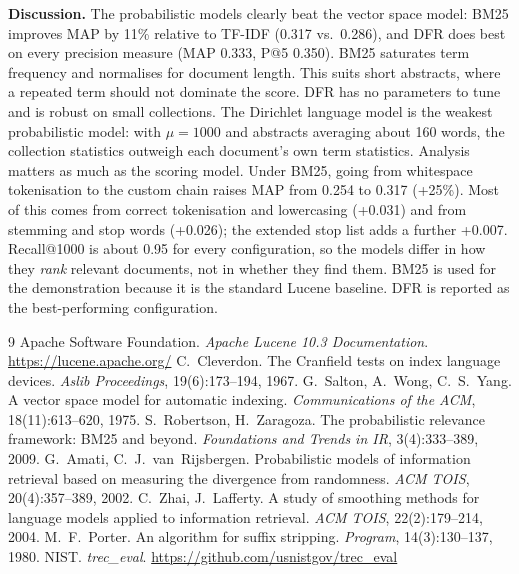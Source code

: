\documentclass[10pt,a4paper]{article}
\begin{document}
\textbf{Discussion.} The probabilistic models clearly beat the vector space model: BM25
improves MAP by 11\% relative to TF-IDF (0.317 vs.\ 0.286), and DFR does best on every
precision measure (MAP 0.333, P@5 0.350). BM25 saturates term frequency and normalises
for document length. This suits short abstracts, where a repeated term should not dominate
the score. DFR has no parameters to tune and is robust on small collections. The Dirichlet
language model is the weakest probabilistic model: with $\mu=1000$ and abstracts averaging
about 160 words, the collection statistics outweigh each document's own term statistics.
Analysis matters as much as the scoring model. Under BM25, going from whitespace tokenisation
to the custom chain raises MAP from 0.254 to 0.317 (+25\%). Most of this comes from correct
tokenisation and lowercasing (+0.031) and from stemming and stop words (+0.026); the extended
stop list adds a further +0.007. Recall@1000 is about 0.95 for every configuration, so the
models differ in how they \emph{rank} relevant documents, not in whether they find them.
BM25 is used for the demonstration because it is the standard Lucene baseline. DFR is
reported as the best-performing configuration.

\begin{thebibliography}{9}\small
\setlength{\itemsep}{0pt}
 Apache Software Foundation. \emph{Apache Lucene 10.3 Documentation}. \url{https://lucene.apache.org/}
 C.~Cleverdon. The Cranfield tests on index language devices. \emph{Aslib Proceedings}, 19(6):173--194, 1967.
 G.~Salton, A.~Wong, C.~S.~Yang. A vector space model for automatic indexing. \emph{Communications of the ACM}, 18(11):613--620, 1975.
 S.~Robertson, H.~Zaragoza. The probabilistic relevance framework: BM25 and beyond. \emph{Foundations and Trends in IR}, 3(4):333--389, 2009.
 G.~Amati, C.~J.~van~Rijsbergen. Probabilistic models of information retrieval based on measuring the divergence from randomness. \emph{ACM TOIS}, 20(4):357--389, 2002.
 C.~Zhai, J.~Lafferty. A study of smoothing methods for language models applied to information retrieval. \emph{ACM TOIS}, 22(2):179--214, 2004.
 M.~F.~Porter. An algorithm for suffix stripping. \emph{Program}, 14(3):130--137, 1980.
 NIST. \emph{trec\_eval}. \url{https://github.com/usnistgov/trec_eval}
\end{thebibliography}
\end{document}
